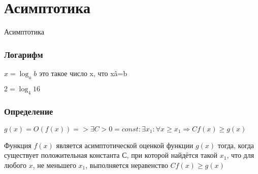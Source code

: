\section{Асимптотика}


\begin{frame}
    \center \Huge Асимптотика
\end{frame}


\begin{frame}
    \frametitle{Логарифм}

    \big 
    $x=\log_a{b}$ это такое число x, что x\^a=b

    $2=\log_4{16}$

\end{frame}


\begin{frame}
    \frametitle{Определение}
    \quad $g(x) = O(f(x)) => \exists C > 0 = const : \exists x_1:  \forall x\geq x_1 \Rightarrow Cf(x) \geq g(x)$ 

    \quad Функция $f(x)$ является асимптотической оценкой функции $g(x)$ тогда, когда существует положительная константа $С$, при которой найдётся такой $x_1$, что для любого $x$, не меньшего $x_1$, выполняется неравенство $Cf(x) \geq g(x)$

\end{frame}


